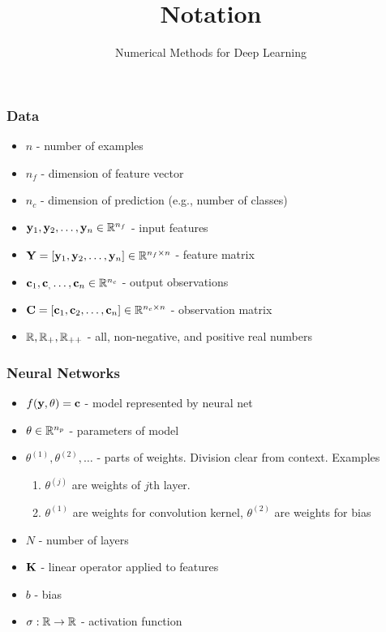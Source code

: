 \documentclass[12pt,fleqn]{beamer}
\title[Notations]{Notation}
\subtitle{Numerical Methods for Deep Learning}
\date{}
\begin{document}
\makebeamertitle

\begin{frame}
	\frametitle{Data}
	
	\begin{itemize}
		\item $n$ - number of examples
		\item $n_f$ - dimension of feature vector
		\item $n_c$ - dimension of prediction (e.g., number of classes)
		\item ${\bf y}_1,{\bf y}_2,\ldots,{\bf y}_n \in\mathbb{R}^{n_f}$ - input features
		\item ${\bf Y} = \left[{\bf y}_1,{\bf y}_2,\ldots,{\bf y}_n \right] \in \mathbb{R}^{n_f \times n}$ - feature matrix
		\item ${\bf c}_1,{\bf c}_,\ldots,{\bf c}_n \in \mathbb{R}^{n_c}$ - output observations 
		\item ${\bf C} = \left[{\bf c}_1, {\bf c}_2,\ldots,{\bf c}_n\right] \in \mathbb{R}^{n_c \times n}$ - observation matrix
		\item $\mathbb{R}, \mathbb{R}_+, \mathbb{R}_{++}$ - all, non-negative, and positive real numbers
	\end{itemize}
\end{frame} 

\begin{frame}
	\frametitle{Neural Networks}
	
	\begin{itemize}
		\item $f({\bf y},\theta) = {\bf c}$ - model represented by neural net
		\item $\theta \in \mathbb{R}^{n_p}$ - parameters of model
		\item $\theta^{(1)}, \theta^{(2)}, \ldots$ - parts of weights. Division clear from context. Examples
		\begin{enumerate}
			\item $\theta^{(j)}$ are weights of $j$th layer.
			\item $\theta^{(1)}$ are weights for convolution kernel, $\theta^{(2)}$ are weights for bias
		\end{enumerate}
		
		\item $N$ - number of layers
		\item ${\bf K}$ - linear operator applied to features
		\item $b$    - bias
		\item $\sigma : \mathbb{R}\to\mathbb{R}$ - activation function
	\end{itemize}
\end{frame} 
\end{document}
